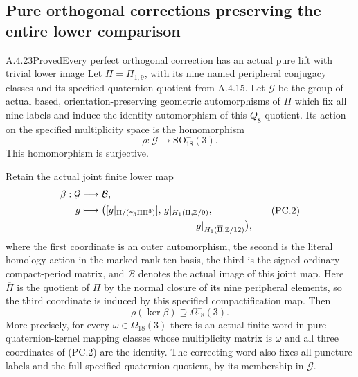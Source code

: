 \subsection{Pure orthogonal corrections preserving the entire lower comparison}

\begin{result}{A.4.23}{Proved}{Every perfect orthogonal correction has an actual pure lift with trivial lower image}
\label{prop:pure-orthogonal-corrections}
Let \(\Pi=\Pi_{1,9}\), with its nine named peripheral conjugacy
classes and its specified quaternion quotient from A.4.15.
Let \(\mathcal G\) be the group of actual based,
orientation-preserving geometric automorphisms of \(\Pi\)
which fix all nine labels and induce the identity automorphism
of this \(Q_8\) quotient. Its action on the specified multiplicity
space is the homomorphism
\[
 \rho:\mathcal G\longrightarrow\mathrm{SO}_{18}^-(3).
 \tag{PC.1}
\]
This homomorphism is surjective.

Retain the actual joint finite lower map
\[
 \begin{split}
 \beta:\mathcal G&\longrightarrow\mathcal B,\\
 g&\longmapsto\bigl([g|_{\Pi/(\gamma_3\Pi\Pi^3)}],\,
                    g|_{H_1(\Pi,\mathbb Z/9)},\\
   &\hspace{42mm}g|_{H_1(\overline\Pi,\mathbb Z/12)}\bigr),
 \end{split}
 \tag{PC.2}
\]
where the first coordinate is an outer automorphism, the second
is the literal homology action in the marked rank-ten basis,
the third is the signed ordinary compact-period matrix, and
\(\mathcal B\) denotes the actual image of this joint map.
Here \(\overline\Pi\) is the quotient of \(\Pi\) by the normal
closure of its nine peripheral elements, so the third coordinate
is induced by this specified compactification map.
Then
\[
                  \rho(\ker\beta)\supseteq\Omega_{18}^-(3).
 \tag{PC.3}
\]
More precisely, for every \(\omega\in\Omega_{18}^-(3)\) there
is an actual finite word in pure quaternion-kernel mapping
classes whose multiplicity matrix is \(\omega\) and all three
coordinates of (PC.2) are the identity. The correcting word
also fixes all puncture labels and the full specified quaternion
quotient, by its membership in \(\mathcal G\).
\end{result}
